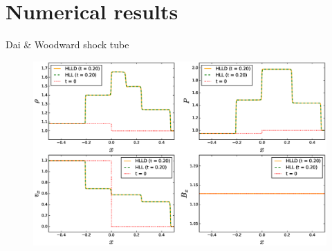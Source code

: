 \documentclass[12pt]{beamer}
\begin{document}
\section{Numerical results}
\begin{frame}{Dai \& Woodward shock tube}
\begin{figure}[ht]
	\centering
	\begin{minipage}[c]{1\textwidth}
		\includegraphics[width=1\textwidth]{DW1.eps}
	\end{minipage}%
\end{figure}
\end{frame}
\end{document}
